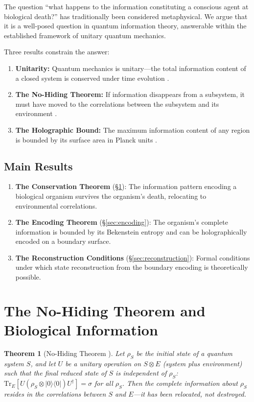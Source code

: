 \documentclass[12pt, a4paper]{article}
\theoremstyle{plain}
\newtheorem{theorem}{Theorem}[section]
\theoremstyle{definition}
\begin{document}
The question ``what happens to the information constituting a conscious
agent at biological death?'' has traditionally been considered metaphysical.
We argue that it is a well-posed question in quantum information theory,
answerable within the established framework of unitary quantum mechanics.

Three results constrain the answer:
\begin{enumerate}[label=(\roman*)]
  \item \textbf{Unitarity:} Quantum mechanics is unitary---the total
    information content of a closed system is conserved under time
    evolution \citep{vonNeumann1932}.
  \item \textbf{The No-Hiding Theorem:} If information disappears from a
    subsystem, it must have moved to the correlations between the subsystem
    and its environment \citep{Braunstein2007}.
  \item \textbf{The Holographic Bound:} The maximum information content
    of any region is bounded by its surface area in Planck units
    \citep{Bekenstein1981, Bousso2002}.
\end{enumerate}

\subsection{Main Results}

\begin{enumerate}
  \item \textbf{The Conservation Theorem} (\S\ref{sec:conservation}):
    The information pattern encoding a biological organism survives
    the organism's death, relocating to environmental correlations.
  \item \textbf{The Encoding Theorem} (\S\ref{sec:encoding}):
    The organism's complete information is bounded by its Bekenstein
    entropy and can be holographically encoded on a boundary surface.
  \item \textbf{The Reconstruction Conditions} (\S\ref{sec:reconstruction}):
    Formal conditions under which state reconstruction from the
    boundary encoding is theoretically possible.
\end{enumerate}

\section{The No-Hiding Theorem and Biological Information}\label{sec:conservation}

\begin{theorem}[No-Hiding Theorem {\citep{Braunstein2007}}]\label{thm:nohiding}
  Let $\rho_S$ be the initial state of a quantum system $S$, and let
  $U$ be a unitary operation on $S \otimes E$ (system plus environment)
  such that the final reduced state of $S$ is independent of $\rho_S$:
  $\text{Tr}_E[U(\rho_S \otimes |0\rangle\langle 0|)U^\dagger] = \sigma$
  for all $\rho_S$. Then the complete information about $\rho_S$ resides
  in the correlations between $S$ and $E$---it has been \emph{relocated},
  not destroyed.
\end{theorem}
\end{document}
